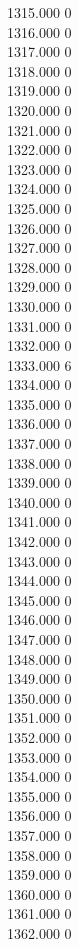 { 1315.000	0 \\
 1316.000	0 \\
 1317.000	0 \\
 1318.000	0 \\
 1319.000	0 \\
 1320.000	0 \\
 1321.000	0 \\
 1322.000	0 \\
 1323.000	0 \\
 1324.000	0 \\
 1325.000	0 \\
 1326.000	0 \\
 1327.000	0 \\
 1328.000	0 \\
 1329.000	0 \\
 1330.000	0 \\
 1331.000	0 \\
 1332.000	0 \\
 1333.000	6 \\
 1334.000	0 \\
 1335.000	0 \\
 1336.000	0 \\
 1337.000	0 \\
 1338.000	0 \\
 1339.000	0 \\
 1340.000	0 \\
 1341.000	0 \\
 1342.000	0 \\
 1343.000	0 \\
 1344.000	0 \\
 1345.000	0 \\
 1346.000	0 \\
 1347.000	0 \\
 1348.000	0 \\
 1349.000	0 \\
 1350.000	0 \\
 1351.000	0 \\
 1352.000	0 \\
 1353.000	0 \\
 1354.000	0 \\
 1355.000	0 \\
 1356.000	0 \\
 1357.000	0 \\
 1358.000	0 \\
 1359.000	0 \\
 1360.000	0 \\
 1361.000	0 \\
 1362.000	0 \\
}
